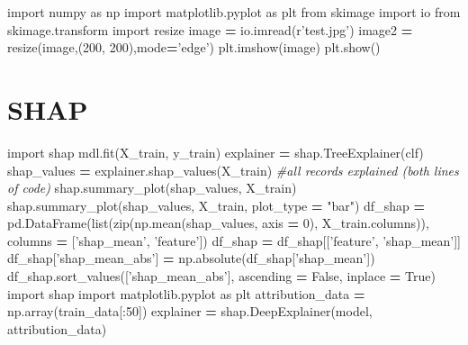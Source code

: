 \documentclass[]{book}
\newenvironment{Shaded}{\begin{snugshade}}{\end{snugshade}}
\newcommand{\DecValTok}[1]{\textcolor[rgb]{0.00,0.00,0.81}{#1}}
\newcommand{\StringTok}[1]{\textcolor[rgb]{0.31,0.60,0.02}{#1}}
\newcommand{\VerbatimStringTok}[1]{\textcolor[rgb]{0.31,0.60,0.02}{#1}}
\newcommand{\ImportTok}[1]{#1}
\newcommand{\CommentTok}[1]{\textcolor[rgb]{0.56,0.35,0.01}{\textit{#1}}}
\newcommand{\VariableTok}[1]{\textcolor[rgb]{0.00,0.00,0.00}{#1}}
\newcommand{\OperatorTok}[1]{\textcolor[rgb]{0.81,0.36,0.00}{\textbf{#1}}}
\newcommand{\BuiltInTok}[1]{#1}
\newcommand{\NormalTok}[1]{#1}
\begin{document}
\begin{Shaded}
\begin{Highlighting}[]
\ImportTok{import}\NormalTok{ numpy }\ImportTok{as}\NormalTok{ np}
\ImportTok{import}\NormalTok{ matplotlib.pyplot }\ImportTok{as}\NormalTok{ plt}
\ImportTok{from}\NormalTok{ skimage }\ImportTok{import}\NormalTok{ io}
\ImportTok{from}\NormalTok{ skimage.transform }\ImportTok{import}\NormalTok{ resize}
\NormalTok{image }\OperatorTok{=}\NormalTok{ io.imread(}\VerbatimStringTok{r'test.jpg'}\NormalTok{)}
\NormalTok{image2 }\OperatorTok{=}\NormalTok{ resize(image,(}\DecValTok{200}\NormalTok{, }\DecValTok{200}\NormalTok{),mode}\OperatorTok{=}\StringTok{'edge'}\NormalTok{)}
\NormalTok{plt.imshow(image)}
\NormalTok{plt.show()}
\end{Highlighting}
\end{Shaded}

\section{SHAP}\label{shap}

\begin{Shaded}
\begin{Highlighting}[]
\ImportTok{import}\NormalTok{ shap}
\NormalTok{mdl.fit(X_train, y_train)}
\NormalTok{explainer }\OperatorTok{=}\NormalTok{ shap.TreeExplainer(clf)}
\NormalTok{shap_values }\OperatorTok{=}\NormalTok{ explainer.shap_values(X_train)}
\CommentTok{#all records explained (both lines of code)}
\NormalTok{shap.summary_plot(shap_values, X_train)}
\NormalTok{shap.summary_plot(shap_values, X_train, plot_type }\OperatorTok{=} \StringTok{"bar"}\NormalTok{)}
\NormalTok{df_shap }\OperatorTok{=}\NormalTok{ pd.DataFrame(}\BuiltInTok{list}\NormalTok{(}\BuiltInTok{zip}\NormalTok{(np.mean(shap_values, axis }\OperatorTok{=} \DecValTok{0}\NormalTok{), X_train.columns)),}
\NormalTok{                       columns }\OperatorTok{=}\NormalTok{ [}\StringTok{'shap_mean'}\NormalTok{, }\StringTok{'feature'}\NormalTok{])}
\NormalTok{df_shap }\OperatorTok{=}\NormalTok{ df_shap[[}\StringTok{'feature'}\NormalTok{, }\StringTok{'shap_mean'}\NormalTok{]]}
\NormalTok{df_shap[}\StringTok{'shap_mean_abs'}\NormalTok{] }\OperatorTok{=}\NormalTok{ np.absolute(df_shap[}\StringTok{'shap_mean'}\NormalTok{])}
\NormalTok{df_shap.sort_values([}\StringTok{'shap_mean_abs'}\NormalTok{], ascending }\OperatorTok{=} \VariableTok{False}\NormalTok{, inplace }\OperatorTok{=} \VariableTok{True}\NormalTok{)}
\ImportTok{import}\NormalTok{ shap}
\ImportTok{import}\NormalTok{ matplotlib.pyplot }\ImportTok{as}\NormalTok{ plt}
\NormalTok{attribution_data }\OperatorTok{=}\NormalTok{ np.array(train_data[:}\DecValTok{50}\NormalTok{])}
\NormalTok{explainer }\OperatorTok{=}\NormalTok{ shap.DeepExplainer(model, attribution_data)}
\end{Highlighting}
\end{Shaded}
\end{document}
